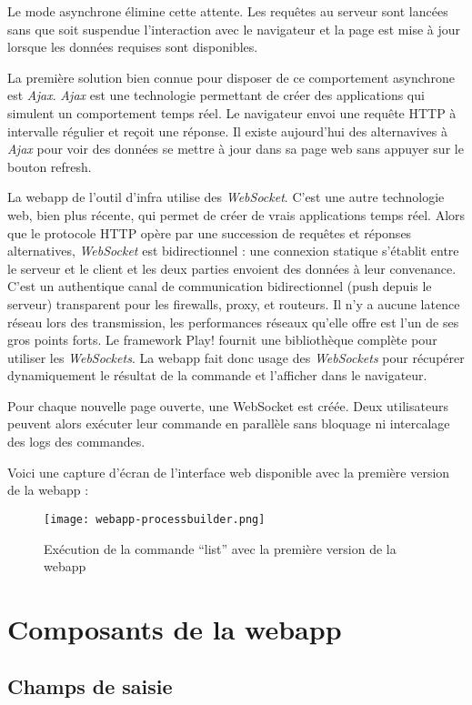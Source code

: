Le mode asynchrone élimine cette attente. Les requêtes au serveur sont lancées
sans que soit suspendue l'interaction avec le navigateur et la page est mise à
jour lorsque les données requises sont disponibles.

La première solution bien connue pour disposer de ce comportement asynchrone est
\textit{Ajax}.
\textit{Ajax} est une technologie permettant de créer des applications qui simulent un
comportement temps réel. Le navigateur envoi une requête HTTP à intervalle
régulier et reçoit une réponse.
Il existe aujourd'hui des alternavives à \textit{Ajax} pour voir des données se mettre à
jour dans sa page web sans appuyer sur le bouton refresh.

La webapp de l'outil d'infra utilise des \textit{WebSocket}.
C'est une autre technologie web, bien plus récente, qui permet de créer de vrais
applications temps réel.
Alors que le protocole HTTP opère par une succession de requêtes et réponses
alternatives, \textit{WebSocket} est bidirectionnel : une connexion statique s'établit
entre le serveur et le client et les deux parties envoient des données à leur
convenance.
C'est un authentique canal de communication bidirectionnel (push depuis le
serveur) transparent pour les firewalls, proxy, et routeurs.
Il n'y a aucune latence réseau lors des transmission, les performances réseaux
qu'elle offre est l'un de ses gros points forts.
Le framework Play! fournit une bibliothèque complète pour utiliser les
\textit{WebSockets}.
La webapp fait donc usage des \textit{WebSockets} pour récupérer dynamiquement le
résultat de la commande et l'afficher dans le navigateur.

Pour chaque nouvelle page ouverte, une WebSocket est créée.
Deux utilisateurs peuvent alors exécuter leur commande en parallèle sans
bloquage ni intercalage des logs des commandes.

Voici une capture d'écran de l'interface web disponible avec la première version
de la webapp :
\begin{figure}[H]
  \texttt{[image: webapp-processbuilder.png]}
  \caption{Exécution de la commande ``list'' avec la première version de la webapp}
\end{figure}


\section{Composants de la webapp}

\subsection{Champs de saisie}

